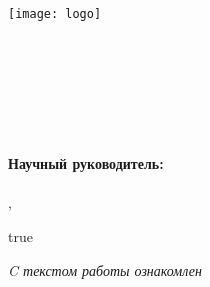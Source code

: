 

\thispagestyle{titlepagestyle}
\begin{SingleSpace}
\begin{center}
\texttt{[image: logo]}\\
{\small
\MakeUppercase{\Univer}\\
\MakeUppercase{\Faculty}\\
\MakeUppercase{\Department}\\[4\baselineskip]
}
\Author\\
\textbf{
  \Title\\[2\baselineskip]
}
\MakeUppercase{\WorkType}\\[3\baselineskip]
\end{center}

\vspace*{2\baselineskip}

\noindent
\ifx\SciAdvisor\empty
%
\else
    \begin{minipage}{0.4\textwidth}
    \phantom{MMMM}
    \end{minipage}
    \begin{minipage}{0.58\textwidth}
            \SingleSpacing
            \textbf{Научный руководитель:}\\
            \Position
            \ifx\AcademicDegree\empty
                \\%
                \SciAdvisor
            \else
                , \AcademicDegree\\%
            \SciAdvisor
            \fi
    \end{minipage}

    \def\True{true}
    \ifx\EnableSign\True
    \vspace*{4\baselineskip}
    \begin{minipage}{0.4\textwidth}
    \phantom{MMMM}
    \end{minipage}
    \begin{minipage}{0.58\textwidth}
    {\small\textit{C текстом работы ознакомлен}}\\[2\baselineskip]
    \underline{\phantom{МММММММММММMM}} \SciAdvisorShort
    \end{minipage}
    \fi
\fi

\end{SingleSpace}
